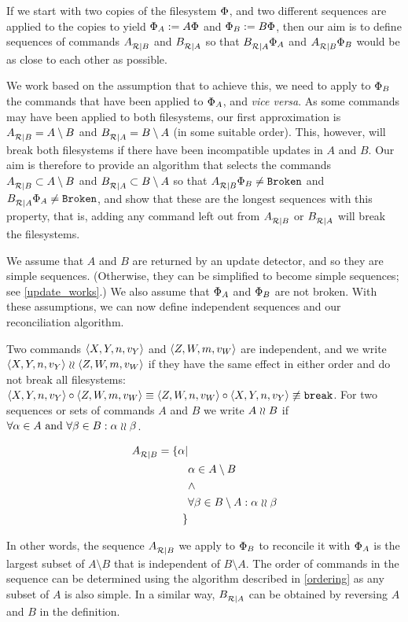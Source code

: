 
If we start with two copies of the filesystem $\Phi$,
and two different sequences are applied to the copies to yield $\Phi_A:=A\Phi$
and $\Phi_B:=B\Phi$, then our aim is to define sequences of commands ${A}^{}_{\mathcal{R}|{B}}$ and ${B}^{}_{\mathcal{R}|{A}}$
so that ${B}^{}_{\mathcal{R}|{A}}\Phi_A$ and ${A}^{}_{\mathcal{R}|{B}}\Phi_B$ would be as close to each other as possible.

We work based on the assumption that to achieve this, we need
to apply to $\Phi_B$ the commands that have been applied to $\Phi_A$, and \emph{vice versa}.
As some commands may have been applied to both filesystems, our first approximation
is ${A}^{}_{\mathcal{R}|{B}} = A\setminus B$ and ${B}^{}_{\mathcal{R}|{A}} = B\setminus A$
(in some suitable order).
This, however, will break both filesystems if there have been incompatible updates
in $A$ and $B$. 
Our aim is therefore to provide an algorithm that selects the commands 
${A}^{}_{\mathcal{R}|{B}} \subset A\setminus B$
and ${B}^{}_{\mathcal{R}|{A}} \subset B\setminus A$ 
so that ${A}^{}_{\mathcal{R}|{B}}\Phi_B\neq\mathtt{Broken}$ and ${B}^{}_{\mathcal{R}|{A}}\Phi_A\neq\mathtt{Broken}$,
and show that these are the longest sequences with this property, that is,
adding any command left out from ${A}^{}_{\mathcal{R}|{B}}$ or ${B}^{}_{\mathcal{R}|{A}}$ will break the filesystems.

We assume that $A$ and $B$ are returned by an update detector,
and so they are simple sequences.
(Otherwise, they can be simplified to become simple sequences; see \cref{update_works}.)
We also assume that $\Phi_A$ and $\Phi_B$ are not broken.
With these assumptions,
we can now define independent sequences and
our reconciliation algorithm.

\begin{mydef}
Two commands $\langle{X,Y,n,v_Y}\rangle$ and $\langle{Z,W,m,v_W}\rangle$ 
are independent, and we write $\langle{X,Y,n,v_Y}\rangle\mathrel{\wr\wr}\langle{Z,W,m,v_W}\rangle$ if 
they have the same effect in either order and do not break all filesystems:
$\langle{X,Y,n,v_Y}\rangle\circ\langle{Z,W,m,v_W}\rangle \equiv \langle{Z,W,n,v_W}\rangle\circ\langle{X,Y,n,v_Y}\rangle \not\equiv \mathtt{break}$.
For two sequences or sets of commands $A$ and $B$ we write $A\mathrel{\wr\wr} B$ if
$\forall \alpha\in A \mbox{~and~} \forall \beta\in B: \alpha\mathrel{\wr\wr}\beta$.
\end{mydef}

\begin{mydef}[Reconciliation]\label{def:reconciliation}
\begin{align*}
{A}^{}_{\mathcal{R}|{B}} = \{\alpha| & \\
& \alpha\in A\setminus B \\
& \wedge \\
& \forall \beta\in B\setminus A: \alpha\mathrel{\wr\wr}\beta\\
\} &
\end{align*}

In other words, the sequence ${A}^{}_{\mathcal{R}|{B}}$ we apply to $\Phi_B$ 
to reconcile it with $\Phi_A$
is the largest subset of $A\setminus B$
that is independent of $B\setminus A$.
The order of commands in the sequence can be determined using the algorithm described in
\cref{ordering} as any subset of $A$ is also simple.
In a similar way, ${B}^{}_{\mathcal{R}|{A}}$ can be obtained by reversing $A$ and $B$
in the definition.
\end{mydef}

